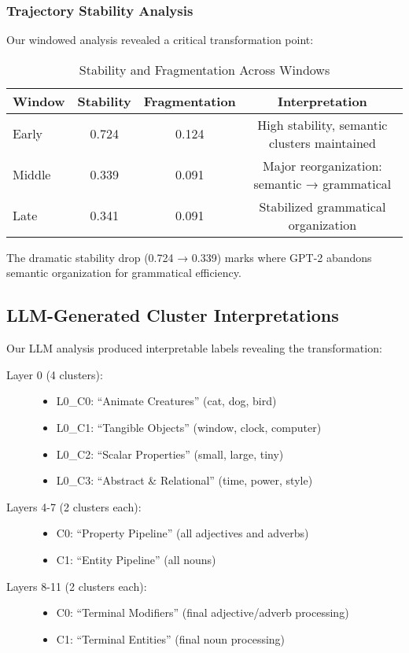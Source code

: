 \subsubsection{Trajectory Stability Analysis}

Our windowed analysis revealed a critical transformation point:

\begin{table}[h!]
\centering
\caption{Stability and Fragmentation Across Windows}
\label{tab:stability_analysis}
\begin{tabular}{lccc}
\toprule
Window & Stability & Fragmentation & Interpretation \\
\midrule
Early & 0.724 & 0.124 & High stability, semantic clusters maintained \\
Middle & 0.339 & 0.091 & Major reorganization: semantic → grammatical \\
Late & 0.341 & 0.091 & Stabilized grammatical organization \\
\bottomrule
\end{tabular}
\end{table}

The dramatic stability drop (0.724 → 0.339) marks where GPT-2 abandons semantic organization for grammatical efficiency.

\subsection{LLM-Generated Cluster Interpretations}

Our LLM analysis produced interpretable labels revealing the transformation:

\begin{description}
    \item[Layer 0 (4 clusters):]
    \begin{itemize}
        \item L0\_C0: ``Animate Creatures'' (cat, dog, bird)
        \item L0\_C1: ``Tangible Objects'' (window, clock, computer)
        \item L0\_C2: ``Scalar Properties'' (small, large, tiny)
        \item L0\_C3: ``Abstract \& Relational'' (time, power, style)
    \end{itemize}
    
    \item[Layers 4-7 (2 clusters each):]
    \begin{itemize}
        \item C0: ``Property Pipeline'' (all adjectives and adverbs)
        \item C1: ``Entity Pipeline'' (all nouns)
    \end{itemize}
    
    \item[Layers 8-11 (2 clusters each):]
    \begin{itemize}
        \item C0: ``Terminal Modifiers'' (final adjective/adverb processing)
        \item C1: ``Terminal Entities'' (final noun processing)
    \end{itemize}
\end{description}

